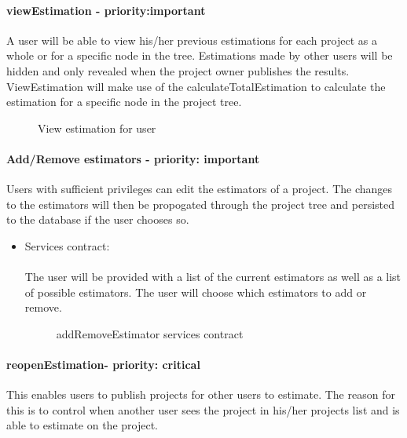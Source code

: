 	\paragraph{viewEstimation - priority:important}A user will be able to view his/her previous estimations for each project as a whole or for a specific node in the tree. Estimations made by other users will be hidden and only revealed when the project owner publishes the results. ViewEstimation will make use of the calculateTotalEstimation to calculate the estimation for a specific node in the project tree.
	\begin{figure}[H]
	    	\centering
	    	\caption{View estimation for user}
	    	\label{fig:Estimation_viewEstimation.png}
   	\end{figure}

	\paragraph{Add/Remove estimators - priority: important}
	Users with sufficient privileges can edit the estimators of a project. The changes to the estimators will then be propogated through the project tree and persisted to the database if the user chooses so.

	\begin{itemize}
		\item Services contract:\\ \\
		The user will be provided with a list of the current estimators as well as a list of possible estimators. The user will choose which estimators to add or remove.
		\begin{figure}[H]
	    	\centering
	    	\caption{addRemoveEstimator services contract}
	    	\label{fig:addremove_estimators_services_contract}
	   	\end{figure}
	\end{itemize}

	\paragraph{reopenEstimation- priority: critical}
	This enables users to publish projects for other users to estimate. The reason for this is to control when another user sees the project in his/her projects list and is able to estimate on the project.

